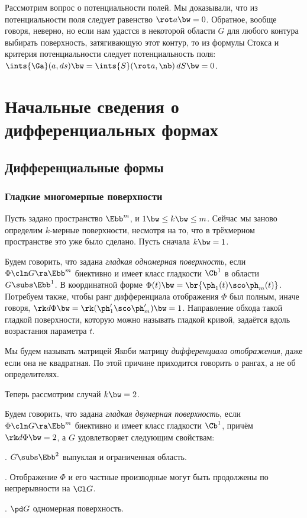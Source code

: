 \documentclass[a4paper]{article}
\begin{document}
Рассмотрим вопрос о потенциальности полей. Мы доказывали, что из потенциальности поля следует равенство
$\rot a \bw= 0$. Обратное, вообще говоря, неверно, но если нам удастся в некоторой области $G$ для
любого контура выбирать поверхность, затягивающую этот контур, то из формулы Стокса и критерия
потенциальности следует потенциальность поля:
$\ints{\Ga}(a, d s) \bw= \ints{S}(\rot a, \nb)\,d S  \bw= 0$.

\section{Начальные сведения о дифференциальных формах}

\subsection{Дифференциальные формы}

\subsubsection{Гладкие многомерные поверхности}
Пусть задано пространство $\Ebb^m$, и $1 \bw\le k \bw\le m$. Сейчас мы заново определим $k$-мерные поверхности,
несмотря на то, что в трёхмерном пространстве это уже было сделано. Пусть сначала $k \bw= 1$.

\begin{df}
Будем говорить, что задана \emph{гладкая одномерная поверхность}, если
$\Phi\cln G \ra \Ebb^m$ биективно и имеет класс гладкости $\Cb^1$ в области $G \subs \Ebb^1$.
В координатной форме $\Phi(t) \bw= \br{\ph_1(t)\sco \ph_m(t)}$.
Потребуем также, чтобы ранг дифференциала отображения $\Phi$ был полным, иначе говоря,
$\rk d\Phi \bw= \rk (\ph_1'\sco \ph_m') \bw= 1$. Направление обхода такой гладкой поверхности,
которую можно называть гладкой кривой, задаётся вдоль возрастания параметра $t$.
\end{df}

\begin{note}
Мы будем называть матрицей Якоби матрицу \emph{дифференциала отображения}, даже если она не квадратная.
По этой причине приходится говорить о рангах, а не об определителях.
\end{note}

Теперь рассмотрим случай $k \bw= 2$.

\begin{df}
Будем говорить, что задана \emph{гладкая двумерная поверхность}, если
$\Phi\cln G \ra \Ebb^m$ биективно и имеет класс гладкости $\Cb^1$, причём $\rk d\Phi \bw= 2$, а
$G$ удовлетворяет следующим свойствам:

. $G \subs \Ebb^2$ выпуклая и ограниченная область.

. Отображение $\Phi$ и его частные производные могут быть продолжены по непрерывности на $\Cl G$.

. $\pd G$ одномерная поверхность.
\end{df}
\end{document}
